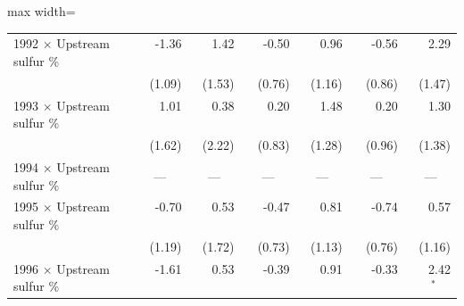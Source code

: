 \begin{table}[htbp]
{\begin{adjustbox}{max width=\linewidth}
\begin{tabular}{lrrrrrr}
1992 $\times$ Upstream sulfur \% & \phantom{(}-1.36$^{\phantom{*}\phantom{*}\phantom{*}}$ & \phantom{(}\phantom{-}1.42$^{\phantom{*}\phantom{*}\phantom{*}}$ & \phantom{(}-0.50$^{\phantom{*}\phantom{*}\phantom{*}}$ & \phantom{(}\phantom{-}0.96$^{\phantom{*}\phantom{*}\phantom{*}}$ & \phantom{(}-0.56$^{\phantom{*}\phantom{*}\phantom{*}}$ & \phantom{(}\phantom{-}2.29$^{\phantom{*}\phantom{*}\phantom{*}}$ \\
 & (\phantom{-}1.09)\phantom{$^{***}$} & (\phantom{-}1.53)\phantom{$^{***}$} & (\phantom{-}0.76)\phantom{$^{***}$} & (\phantom{-}1.16)\phantom{$^{***}$} & (\phantom{-}0.86)\phantom{$^{***}$} & (\phantom{-}1.47)\phantom{$^{***}$} \\
1993 $\times$ Upstream sulfur \% & \phantom{(}\phantom{-}1.01$^{\phantom{*}\phantom{*}\phantom{*}}$ & \phantom{(}\phantom{-}0.38$^{\phantom{*}\phantom{*}\phantom{*}}$ & \phantom{(}\phantom{-}0.20$^{\phantom{*}\phantom{*}\phantom{*}}$ & \phantom{(}\phantom{-}1.48$^{\phantom{*}\phantom{*}\phantom{*}}$ & \phantom{(}\phantom{-}0.20$^{\phantom{*}\phantom{*}\phantom{*}}$ & \phantom{(}\phantom{-}1.30$^{\phantom{*}\phantom{*}\phantom{*}}$ \\
 & (\phantom{-}1.62)\phantom{$^{***}$} & (\phantom{-}2.22)\phantom{$^{***}$} & (\phantom{-}0.83)\phantom{$^{***}$} & (\phantom{-}1.28)\phantom{$^{***}$} & (\phantom{-}0.96)\phantom{$^{***}$} & (\phantom{-}1.38)\phantom{$^{***}$} \\
1994 $\times$ Upstream sulfur \% & \multicolumn{1}{c}{---} & \multicolumn{1}{c}{---} & \multicolumn{1}{c}{---} & \multicolumn{1}{c}{---} & \multicolumn{1}{c}{---} & \multicolumn{1}{c}{---} \\
1995 $\times$ Upstream sulfur \% & \phantom{(}-0.70$^{\phantom{*}\phantom{*}\phantom{*}}$ & \phantom{(}\phantom{-}0.53$^{\phantom{*}\phantom{*}\phantom{*}}$ & \phantom{(}-0.47$^{\phantom{*}\phantom{*}\phantom{*}}$ & \phantom{(}\phantom{-}0.81$^{\phantom{*}\phantom{*}\phantom{*}}$ & \phantom{(}-0.74$^{\phantom{*}\phantom{*}\phantom{*}}$ & \phantom{(}\phantom{-}0.57$^{\phantom{*}\phantom{*}\phantom{*}}$ \\
 & (\phantom{-}1.19)\phantom{$^{***}$} & (\phantom{-}1.72)\phantom{$^{***}$} & (\phantom{-}0.73)\phantom{$^{***}$} & (\phantom{-}1.13)\phantom{$^{***}$} & (\phantom{-}0.76)\phantom{$^{***}$} & (\phantom{-}1.16)\phantom{$^{***}$} \\
1996 $\times$ Upstream sulfur \% & \phantom{(}-1.61$^{\phantom{*}\phantom{*}\phantom{*}}$ & \phantom{(}\phantom{-}0.53$^{\phantom{*}\phantom{*}\phantom{*}}$ & \phantom{(}-0.39$^{\phantom{*}\phantom{*}\phantom{*}}$ & \phantom{(}\phantom{-}0.91$^{\phantom{*}\phantom{*}\phantom{*}}$ & \phantom{(}-0.33$^{\phantom{*}\phantom{*}\phantom{*}}$ & \phantom{(}\phantom{-}2.42$^{*\phantom{*}\phantom{*}}$ \\

\end{tabular}
\end{adjustbox}}
\end{table}
